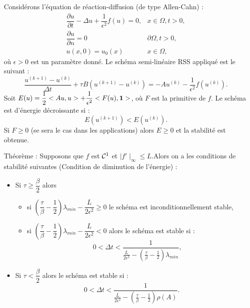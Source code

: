 \documentclass[11pt]{beamer}
\begin{document}
\begin{frame}
Considérons l'équation de réaction-diffusion (de type Allen-Cahn) :
\begin{equation}
\begin{array}{rl}
\dfrac{\partial u}{\partial t} -\Delta u +\dfrac{1}{\epsilon^2}f(u)=0, & x\in \Omega, t>0,\\
\dfrac{\partial u}{\partial n}= 0 & \partial \Omega , t>0,\\
u(x,0)=u_0(x) & x\in \Omega ,
\end{array}
\end{equation}
 où $\epsilon >0$ est un paramètre donné. Le schéma semi-linéaire RSS appliqué est le suivant :
\begin{equation}
 \dfrac{u^{(k+1)}-u^{(k)}}{\Delta t} +\tau B (u^{(k+1)}-u^{(k)}) =-Au^{(k)}-\dfrac{1}{\epsilon^2}f(u^{(k)}) .
 \label{RSSAC}
 \end{equation}
  Soit $E(u)=\dfrac{1}{2}<Au,u>+\dfrac{1}{\epsilon^2}<F(u),{\bf 1}>$, où $F$ est la primitive de $f$.
 Le schéma est d'énergie décroissante si :
 $$
 E(u^{(k+1)}) < E(u^{(k)}).
 $$
 Si $F\ge 0$ (se sera le cas dans les applications) alors $E\ge 0$ et la stabilité est obtenue.
 \end{frame}
%
 \begin{frame}
 \begin{block}{Théorème :}
Supposons que $f$ est ${\cal C}^1$ et $\mid f'\mid_{\infty}\le L$.Alors on a les conditions de stabilité suivantes 
(Condition de diminution de l'énergie) :
\begin{itemize}
\item Si $\tau\ge \dfrac{\beta}{2}$ alors
\begin{itemize}
\item si $\left(\dfrac{\tau}{\beta}-\dfrac{1}{2}\right)\lambda_{min} -\dfrac{L}{2\epsilon^2}\ge 0$ le schéma est inconditionnellement stable,
\item si $\left(\dfrac{\tau}{\beta}-\dfrac{1}{2}\right)\lambda_{min} -\dfrac{L}{2\epsilon^2}< 0$ alors le schéma est stable si :
$$
0<\Delta t <\dfrac{1}{\frac{L}{2\epsilon^2} -\left(\frac{\tau}{\beta}-\frac{1}{2}\right)\lambda_{min}},
$$
\end{itemize}
\item Si $\tau < \dfrac{\beta}{2}$ alors le schéma est stable si :
$$
0<\Delta t <\dfrac{1}{\frac{L}{2\epsilon^2} -\left(\frac{\tau}{\beta}-\frac{1}{2}\right)\rho(A)}.
$$
\end{itemize} 
\label{Stab_AC}
\end{block}
\end{frame}
\end{document}
